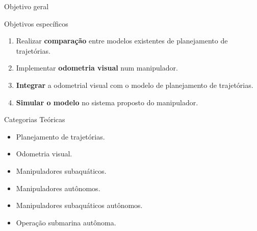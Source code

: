 \begin{frame}[c]{Objetivo geral}

\end{frame}
\begin{frame}[c]{Objetivos específicos}
    \centering
    \begin{enumerate}
        \item Realizar \textbf{comparação} entre modelos existentes de planejamento de trajetórias.
        \item Implementar \textbf{odometria visual} num manipulador.
        \item \textbf{Integrar} a odometrial visual com o modelo de planejamento de trajetórias.
        \item \textbf{Simular o modelo} no sistema proposto do manipulador.
    \end{enumerate}
\end{frame}
\begin{frame}[c]{Categorias Teóricas}
    \centering
    \begin{itemize}
        \item Planejamento de trajetórias.
        \item Odometria visual.
        \item Manipuladores subaquáticos.
        \item Manipuladores autônomos.
        \item Manipuladores subaquáticos autônomos.
        \item Operação submarina autônoma.
    \end{itemize}

\end{frame}

